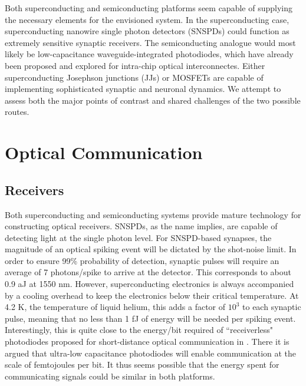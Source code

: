 \documentclass[conference]{IEEEtran}
\begin{document}
Both superconducting and semiconducting platforms seem capable of supplying the necessary elements for the envisioned system. In the superconducting case, superconducting nanowire single photon detectors (SNSPDs) could function as extremely sensitive synaptic receivers. The semiconducting analogue would most likely be low-capacitance waveguide-integrated photodiodes, which have already been proposed and explored for intra-chip optical interconnectes. Either superconducting Josephson junctions (JJs) or MOSFETs are capable of implementing sophisticated synaptic and neuronal dynamics. We attempt to assess both the major points of contrast and shared challenges of the two possible routes.

\section{Optical Communication}
\subsection{Receivers}
Both superconducting and semiconducting systems provide mature technology for constructing optical receivers. SNSPDs, as the name implies, are capable of detecting light at the single photon level. For SNSPD-based synapses, the magnitude of an optical spiking event will be dictated by the shot-noise limit. In order to ensure 99\% probability of detection, synaptic pulses will require an average of 7 photons/spike to arrive at the detector. This corresponds to about 0.9 aJ at 1550 nm. However, superconducting electronics is always accompanied by a cooling overhead to keep the electronics below their critical temperature. At 4.2 K, the temperature of liquid helium, this adds a factor of $10^3$ to each synaptic pulse, meaning that no less than 1 fJ of energy will be needed per spiking event. Interestingly, this is quite close to the energy/bit required of ``receiverless" photodiodes proposed for short-distance optical communication in \cite{miller2017attojoule}. There it is argued that ultra-low capacitance photodiodes will enable communication at the scale of femtojoules per bit. It thus seems possible that the energy spent for communicating signals could be similar in both platforms.
\end{document}
